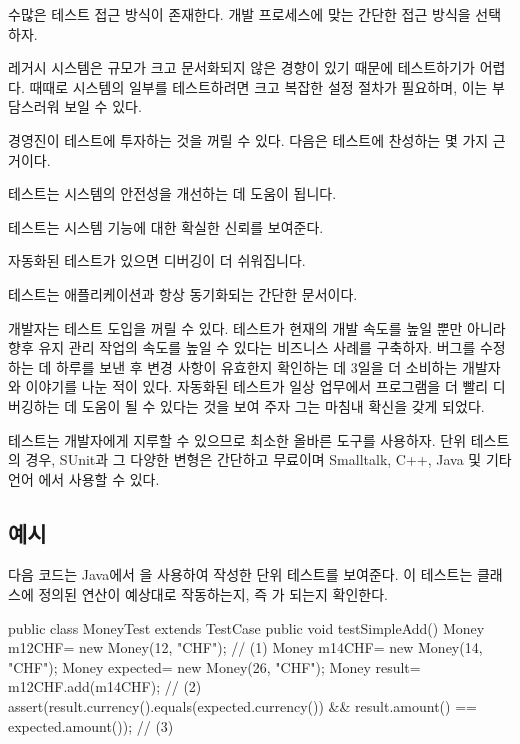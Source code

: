 \documentclass[a4paper,10pt,twoside]{book}
\begin{document}
\begin{bulletlist}
\item 수많은 테스트 접근 방식이 존재한다. 개발 프로세스에 맞는 간단한 접근 방식을 선택하자.
\item 레거시 시스템은 규모가 크고 문서화되지 않은 경향이 있기 때문에 테스트하기가 어렵다. 때때로 시스템의 일부를 테스트하려면 크고 복잡한 설정 절차가 필요하며, 이는 부담스러워 보일 수 있다.
\item 경영진이 테스트에 투자하는 것을 꺼릴 수 있다. 다음은 테스트에 찬성하는 몇 가지 근거이다.

\begin{bulletlist}
\item 테스트는 시스템의 안전성을 개선하는 데 도움이 됩니다. 

\item 테스트는 시스템 기능에 대한 확실한 신뢰를 보여준다.

\item 자동화된 테스트가 있으면 디버깅이 더 쉬워집니다.

\item 테스트는 애플리케이션과 항상 동기화되는 간단한 문서이다. 
\end{bulletlist}

\item 개발자는 테스트 도입을 꺼릴 수 있다. 테스트가 현재의 개발 속도를 높일 뿐만 아니라 향후 유지 관리 작업의 속도를 높일 수 있다는 비즈니스 사례를 구축하자. 버그를 수정하는 데 하루를 보낸 후 변경 사항이 유효한지 확인하는 데 3일을 더 소비하는 개발자와 이야기를 나눈 적이 있다. 자동화된 테스트가 일상 업무에서 프로그램을 더 빨리 디버깅하는 데 도움이 될 수 있다는 것을 보여 주자 그는 마침내 확신을 갖게 되었다.
\item 테스트는 개발자에게 지루할 수 있으므로 최소한 올바른 도구를 사용하자. 단위 테스트의 경우, SUnit과 그 다양한 변형은 간단하고 무료이며 Smalltalk, C++, Java 및 기타 언어 \cite{Beck98a}에서 사용할 수 있다.
\end{bulletlist}

\subsection*{예시}

다음 코드는 Java\cite{Beck98a}에서 을 사용하여 작성한 단위 테스트를 보여준다. 이 테스트는  클래스에 정의된  연산이 예상대로 작동하는지, 즉 가 되는지 확인한다.

\begin{code}
public class MoneyTest extends TestCase {
	public void testSimpleAdd() {
		Money m12CHF= new Money(12, "CHF");                 // (1)
		Money m14CHF= new Money(14, "CHF");        
		Money expected= new Money(26, "CHF");
		Money result= m12CHF.add(m14CHF);                     // (2)
		assert(result.currency().equals(expected.currency())
			&& result.amount() == expected.amount());            // (3)
	}
}
\end{code}
\end{document}
